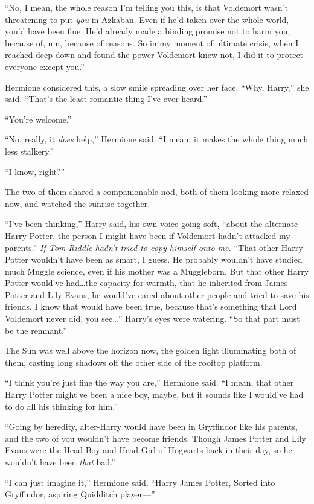“No, I mean, the whole reason I’m telling you this, is that Voldemort wasn’t threatening to put \emph{you} in Azkaban. Even if he’d taken over the whole world, you’d have been fine. He’d already made a binding promise not to harm you, because of, um, because of reasons. So in my moment of ultimate crisis, when I reached deep down and found the power Voldemort knew not, I did it to protect everyone except you.”

Hermione considered this, a slow smile spreading over her face. “Why, Harry,” she said. “That’s the least romantic thing I’ve ever heard.”

“You’re welcome.”

“No, really, it \emph{does} help,” Hermione said. “I mean, it makes the whole thing much less stalkery.”

“I know, right?”

The two of them shared a companionable nod, both of them looking more relaxed now, and watched the sunrise together.

“I’ve been thinking,” Harry said, his own voice going soft, “about the alternate Harry Potter, the person I might have been if Voldemort hadn’t attacked my parents.” \emph{If Tom Riddle hadn’t tried to copy himself onto me.} “That other Harry Potter wouldn’t have been as smart, I guess. He probably wouldn’t have studied much Muggle science, even if his mother was a Muggleborn. But that other Harry Potter would’ve had…the capacity for warmth, that he inherited from James Potter and Lily Evans, he would’ve cared about other people and tried to save his friends, I know that would have been true, because that’s something that Lord Voldemort never did, you see…” Harry’s eyes were watering. “So that part must be the remnant.”

The Sun was well above the horizon now, the golden light illuminating both of them, casting long shadows off the other side of the rooftop platform.

“I think you’re just fine the way you are,” Hermione said. “I mean, that other Harry Potter might’ve been a nice boy, maybe, but it sounds like I would’ve had to do all his thinking for him.”

“Going by heredity, alter-Harry would have been in Gryffindor like his parents, and the two of you wouldn’t have become friends. Though James Potter and Lily Evans were the Head Boy and Head Girl of Hogwarts back in their day, so he wouldn’t have been \emph{that} bad.”

“I can just imagine it,” Hermione said. “Harry James Potter, Sorted into Gryffindor, aspiring Quidditch player—”

